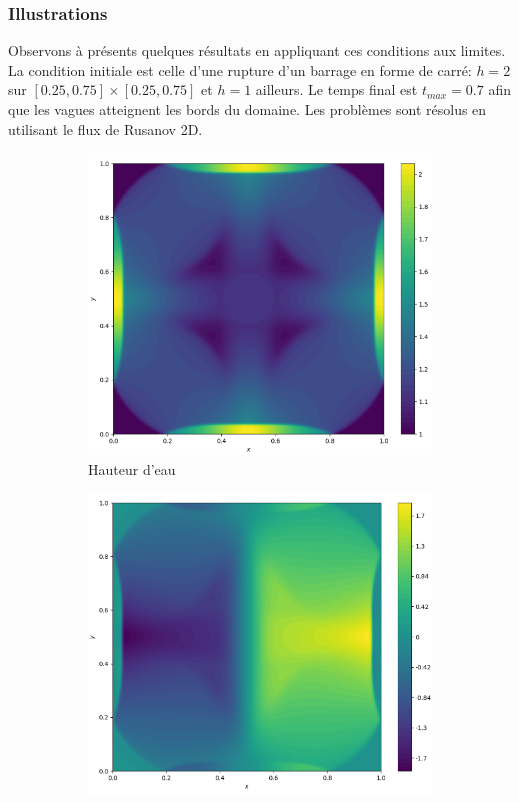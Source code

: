 \documentclass[
	french,
	11pt, %
]{fphw}
\begin{document}
\subsubsection*{Illustrations}
Observons à présents quelques résultats en appliquant ces conditions aux limites. La condition initiale est celle d'une rupture d'un barrage en forme de carré: $h = 2$ sur $[0.25,0.75]\times[0.25,0.75]$ et $h=1$ ailleurs. Le temps final est $t_{max} = 0.7$ afin que les vagues atteignent les bords du domaine. Les problèmes sont résolus en utilisant le flux de Rusanov 2D.

\begin{figure}[H]
	\centering
	\begin{subfigure}{0.32\textwidth}
		\centering
		\includegraphics[width=\textwidth,height=0.85\textwidth]{Bord1h.png}
		\caption{Hauteur d'eau}
		\label{fig:Bord1h}
	\end{subfigure}
	\begin{subfigure}{0.32\textwidth}
		\centering
		\includegraphics[width=\textwidth,height=0.85\textwidth]{Bord1u.png}

\end{subfigure}
\end{figure}
\end{document}

